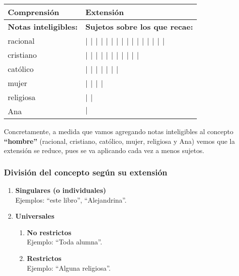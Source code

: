 \documentclass{article}
\begin{document}
\begin{center}
\begin{tabular}{ l|l } 
    \hline
    \textbf{Comprensión} & \textbf{Extensión} \\
    \hline
    \textbf{Notas inteligibles:} & \textbf{Sujetos sobre los que recae:} \\
    racional & \textbf{ \(\vert\) \(\vert\) \(\vert\) \(\vert\) \(\vert\) \(\vert\) \(\vert\) \(\vert\) \(\vert\) \(\vert\) \(\vert\) \(\vert\) \(\vert\) \(\vert\) \(\vert\) \(\vert\) } \\
    cristiano & \textbf{ \(\vert\) \(\vert\) \(\vert\) \(\vert\) \(\vert\) \(\vert\) \(\vert\) \(\vert\) \(\vert\) \(\vert\) \(\vert\) } \\
    católico & \textbf{ \(\vert\) \(\vert\) \(\vert\) \(\vert\) \(\vert\) \(\vert\) \(\vert\) } \\
    mujer & \textbf{ \(\vert\) \(\vert\) \(\vert\) \(\vert\)} \\
    religiosa & \textbf{ \(\vert\) \(\vert\)} \\
    Ana & \textbf{ \(\vert\)} \\
    \hline
\end{tabular}
\end{center}
    
    Concretamente, a medida que vamos agregando notas inteligibles al concepto \textbf{``hombre''} (racional, cristiano, católico, mujer, religiosa y Ana) vemos que la extensión se reduce, pues se va aplicando cada vez a menos sujetos. \par
    
\newpage
    
\subsubsection{División del concepto según su extensión}
    
\begin{enumerate}
    \item \textbf{Singulares (o individuales)} \\
    Ejemplos: ``este libro'', ``Alejandrina''.
    \item \textbf{Universales}
    \begin{enumerate}
        \item \textbf{No restrictos} \\
        Ejemplo: ``Toda alumna''.
        \item \textbf{Restrictos} \\
        Ejemplo: ``Alguna religiosa''.
    \end{enumerate}
\end{enumerate}
\end{document}

